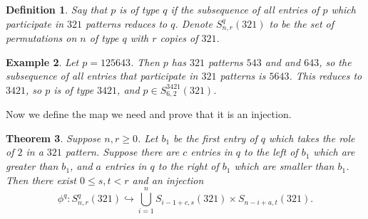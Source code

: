 \documentclass[11pt]{amsart}
\newtheorem{theorem}{Theorem}[section]								\newtheorem{proposition}[theorem]{Proposition}
\newtheorem{definition}[theorem]{Definition}
\newtheorem{example}[theorem]{Example}
\theoremstyle{remark}
\numberwithin{equation}{section}
\begin{document}
\begin{definition}
    Say that $p$ is of type $q$ if the subsequence of all entries of $p$ which participate in $321$ patterns reduces to $q$. Denote $S_{n,r}^{q}(321)$ to be the set of permutations on $n$ of type $q$ with $r$ copies of $321$.
\end{definition}

\begin{example}
    Let $p = 125643$. Then $p$ has $321$ patterns $543$ and and $643$, so the subsequence of all entries that participate in $321$ patterns is $5643$. This reduces to $3421$, so $p$ is of type $3421$, and $p\in S_{6,2}^{3421}(321)$.
\end{example}




\vspace{10pt}
Now we define the map we need and prove that it is an injection.

\begin{theorem}
    Suppose $n,r \geq 0$. Let $b_1$ be the first entry of $q$ which takes the role of $2$ in a $321$ pattern. Suppose there are $c$ entries in $q$ to the left of $b_1$ which are greater than $b_1$, and $a$ entries in $q$ to the right of $b_1$ which are smaller than $b_1$. Then there exist $0 \leq s,t < r$ and an injection
    \[
    \phi^q: S_{n,r}^{q}(321) \hookrightarrow \bigcup_{i = 1}^{n} S_{i - 1 + c,s}(321) \times S_{n-i + a,t}(321).
    \]
\end{theorem}
\end{document}
